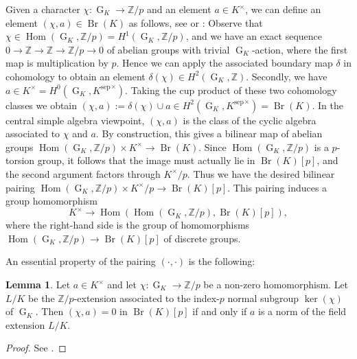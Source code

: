 \documentclass[a4paper, british, oneside]{amsart}
\newcommand{\Z}{\mathbb{Z}}
\DeclareMathOperator{\G}{G}
\DeclareMathOperator{\Br}{Br}
\DeclareMathOperator{\Hom}{Hom}
\theoremstyle{definition}
\newtheorem{lemma}[theorem]{Lemma}
\theoremstyle{remark}
\begin{document}
Given a character $\chi \colon \G_K \to \Z/p$ and an element $a \in K^\times$, we can define an element $(\chi, a) \in \Br(K)$ as follows, see \cite[Chapitre XIV, §1]{CorpsLocaux} or \cite[Proposition 4.7.3]{GilleSzamuely_2nd}:
Observe that $\chi \in \Hom(\G_K, \Z/p) = H^1(\G_K, \Z/p)$, and we have an exact sequence $0 \to \Z \to \Z \to \Z/p \to 0$ of abelian groups with trivial $\G_K$-action, where the first map is multiplication by $p$.
Hence we can apply the associated boundary map $\delta$ in cohomology to obtain an element $\delta(\chi) \in H^2(\G_K, \Z)$.
Secondly, we have $a \in K^\times = H^0(\G_K, {K^{\mathrm{sep}}}^\times)$.
Taking the cup product of these two cohomology classes we obtain $(\chi, a) := \delta(\chi) \cup a \in H^2(\G_K, {K^{\mathrm{sep}}}^\times) = \Br(K)$.
In the central simple algebra viewpoint, $(\chi, a)$ is the class of the cyclic algebra associated to $\chi$ and $a$.
By construction, this gives a bilinear map of abelian groups $\Hom(\G_K, \Z/p) \times K^\times \to \Br(K)$.
Since $\Hom(\G_K, \Z/p)$ is a $p$-torsion group, it follows that the image must actually lie in $\Br(K)[p]$, and the second argument factors through $K^\times/p$.
Thus we have the desired bilinear pairing $\Hom(\G_K, \Z/p) \times K^\times/p \to \Br(K)[p]$.
This pairing induces a group homomorphism \[ K^\times \to \Hom(\Hom(\G_K, \Z/p), \Br(K)[p]),\]
where the right-hand side is the group of homomorphisms $\Hom(\G_K, \Z/p) \to \Br(K)[p]$ of discrete groups.

An essential property of the pairing $(\cdot, \cdot)$ is the following:
\begin{lemma}\label{lem:kernel-pairing-norm}
  Let $a \in K^\times$ and let $\chi \colon \G_K \to \Z/p$ be a non-zero homomorphism.
  Let $L/K$ be the $\Z/p$-extension associated to the index-$p$ normal subgroup $\ker(\chi)$ of $\G_K$.
  Then $(\chi, a) = 0$ in $\Br(K)[p]$ if and only if $a$ is a norm of the field extension $L/K$.
\end{lemma}
\begin{proof}
  See \cite[Corollary 4.7.5]{GilleSzamuely_2nd}.
\end{proof}
\end{document}
